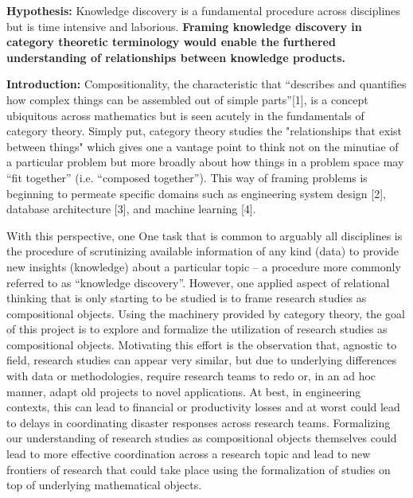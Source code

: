\documentclass[11pt]{extarticle}
\begin{document}
\textbf{Hypothesis:} Knowledge discovery is a fundamental procedure across disciplines but is time intensive and laborious.
\textbf{Framing knowledge discovery in category theoretic terminology would enable the furthered understanding of relationships between knowledge products.}

\textbf{Introduction:} Compositionality, the characteristic that ``describes and quantifies how complex things can be assembled out of simple parts''[1], is a concept ubiquitous across mathematics but is seen acutely in the fundamentals of category theory.
Simply put, category theory studies the "relationships that exist between things" which gives one a vantage point to think not on the minutiae of a particular problem but more broadly about how things in a problem space may ``fit together'' (i.e. ``composed together'').
This way of framing problems is beginning to permeate specific domains such as engineering system design [2], database architecture [3], and machine learning [4]. 

With this perspective, one 
One task that is common to arguably all disciplines is the procedure of scrutinizing available information of any kind (data) to provide new insights (knowledge) about a particular topic -- a procedure more commonly referred to as ``knowledge discovery''.
However, one applied aspect of relational thinking that is only starting to be studied is to frame research studies as compositional objects. 
Using the machinery provided by category theory, the goal of this project is to explore and formalize the utilization of research studies as compositional objects. 
Motivating this effort is the observation that, agnostic to field, research studies can appear very similar, but due to underlying differences with data or methodologies, require research teams to redo or, in an ad hoc manner, adapt old projects to novel applications. 
At best, in engineering contexts, this can lead to financial or productivity losses and at worst could lead to delays in coordinating disaster responses across research teams. 
Formalizing our understanding of research studies as compositional objects themselves could lead to more effective coordination across a research topic and lead to new frontiers of research that could take place using the formalization of studies on top of underlying mathematical objects.
\end{document}
